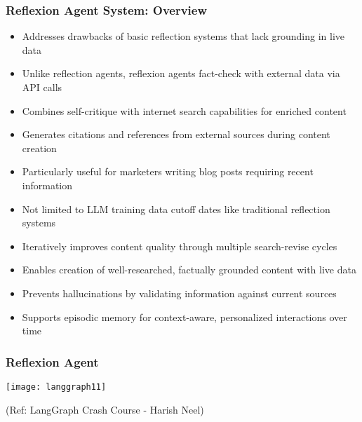 \begin{frame}[fragile]\frametitle{Reflexion Agent System: Overview}
      \begin{itemize}
          \item Addresses drawbacks of basic reflection systems that lack grounding in live data
          \item Unlike reflection agents, reflexion agents fact-check with external data via API calls
          \item Combines self-critique with internet search capabilities for enriched content
          \item Generates citations and references from external sources during content creation
          \item Particularly useful for marketers writing blog posts requiring recent information
          \item Not limited to LLM training data cutoff dates like traditional reflection systems
          \item Iteratively improves content quality through multiple search-revise cycles
          \item Enables creation of well-researched, factually grounded content with live data
          \item Prevents hallucinations by validating information against current sources
          \item Supports episodic memory for context-aware, personalized interactions over time
      \end{itemize}
\end{frame}

\begin{frame}[fragile]\frametitle{Reflexion Agent}

\begin{center}
\texttt{[image: langgraph11]}

{\tiny (Ref: LangGraph Crash Course - Harish Neel)}

\end{center}	  


\end{frame}


